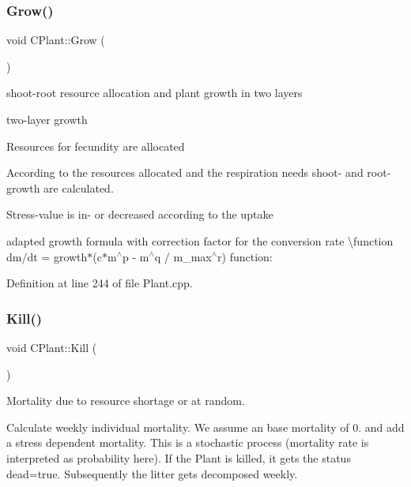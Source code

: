 \subsubsection{\texorpdfstring{Grow()}{Grow()}}
{\footnotesize\ttfamily void C\+Plant\+::\+Grow (\begin{DoxyParamCaption}{ }\end{DoxyParamCaption})\hspace{0.3cm}{\ttfamily [virtual]}}



shoot-\/root resource allocation and plant growth in two layers 

two-\/layer growth
\begin{DoxyEnumerate}
\item Resources for fecundity are allocated
\item According to the resources allocated and the respiration needs shoot-\/ and root-\/growth are calculated.
\item Stress-\/value is in-\/ or decreased according to the uptake
\end{DoxyEnumerate}

adapted growth formula with correction factor for the conversion rate \textbackslash{}function dm/dt = growth$\ast$(c$\ast$m$^\wedge$p -\/ m$^\wedge$q / m\+\_\+max$^\wedge$r) function\+: 

Definition at line 244 of file Plant.\+cpp.

\mbox{\label{class_c_plant_a79fb5e9ec6b21eb939a25252c8cca2e2}} 
\subsubsection{\texorpdfstring{Kill()}{Kill()}}
{\footnotesize\ttfamily void C\+Plant\+::\+Kill (\begin{DoxyParamCaption}{ }\end{DoxyParamCaption})\hspace{0.3cm}{\ttfamily [virtual]}}



Mortality due to resource shortage or at random. 

Calculate weekly individual mortality. We assume an base mortality of 0. and add a stress dependent mortality. This is a stochastic process (mortality rate is interpreted as probability here). If the Plant is killed, it gets the status dead=true. Subsequently the litter gets decomposed weekly. 

